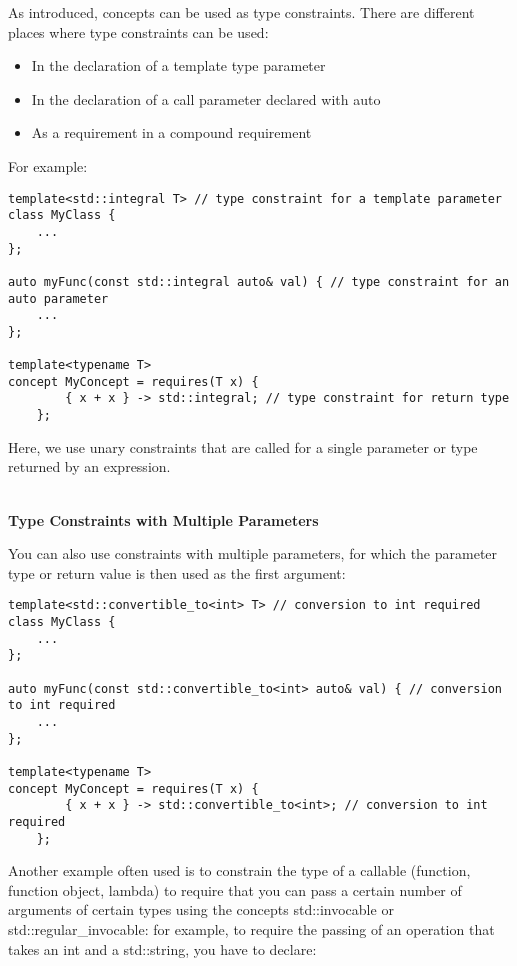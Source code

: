 As introduced, concepts can be used as type constraints. There are different places where type constraints can be used:

\begin{itemize}
\item
In the declaration of a template type parameter

\item
In the declaration of a call parameter declared with auto

\item
As a requirement in a compound requirement
\end{itemize}

For example:

\begin{lstlisting}[style=styleCXX]
template<std::integral T> // type constraint for a template parameter
class MyClass {
	...
};

auto myFunc(const std::integral auto& val) { // type constraint for an auto parameter
	...
};

template<typename T>
concept MyConcept = requires(T x) {
		{ x + x } -> std::integral; // type constraint for return type
	};
\end{lstlisting}

Here, we use unary constraints that are called for a single parameter or type returned by an expression.

\noindent
\hspace*{\fill} \\ %
\textbf{Type Constraints with Multiple Parameters}

You can also use constraints with multiple parameters, for which the parameter type or return value is then used as the first argument:

\begin{lstlisting}[style=styleCXX]
template<std::convertible_to<int> T> // conversion to int required
class MyClass {
	...
};

auto myFunc(const std::convertible_to<int> auto& val) { // conversion to int required
	...
};

template<typename T>
concept MyConcept = requires(T x) {
		{ x + x } -> std::convertible_to<int>; // conversion to int required
	};
\end{lstlisting}

Another example often used is to constrain the type of a callable (function, function object, lambda) to require that you can pass a certain number of arguments of certain types using the concepts std::invocable or std::regular\_invocable: for example, to require the passing of an operation that takes an int and a std::string, you have to declare:

